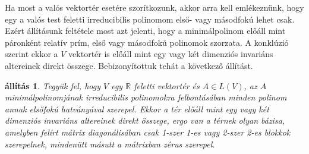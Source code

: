 \documentclass[9pt, a4paper, showtrims]{memoir}
\theoremstyle{plain}
\newtheorem{proposition}{állítás}[chapter]
\theoremstyle{remark}
\theoremstyle{definition}
\begin{document}
Ha most a valós vektortér esetére szorítkozunk, akkor arra kell emlékeznünk, hogy
egy a valós test feletti irreducibilis polinomom első- vagy másodfokú lehet csak.
Ezért állításunk feltétele most azt jelenti, 
hogy a minimálpolinom előáll mint páronként relatív prím, első vagy másodfokú polinomok szorzata.
A konklúzió szerint ekkor a $V$ vektortér is előáll mint egy vagy két dimenziós invariáns altereinek direkt összege. Bebizonyítottuk tehát a következő állítást.
\begin{proposition}
	Tegyük fel, hogy $V$ egy $\mathbb{R}$ feletti vektortér és $A\in L\left( V \right)$,
    az $A$ minimálpolinomjának irreducibilis polinomokra felbontásában minden polinom annak elsőfokú hatványával szerepel.
    Ekkor a tér előáll mint egy vagy két dimenziós invariáns altereinek direkt összege,
    ergo van a térnek olyan bázisa, amelyben felírt mátrix diagonálisában csak 1-szer 1-es vagy 2-szer 2-es blokkok szerepelnek, mindenütt másutt a mátrixban zérus szerepel.
\end{proposition}
\end{document}
